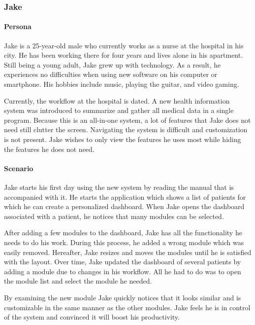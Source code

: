         \subsubsection{Jake}

        \paragraph{Persona} Jake is a 25-year-old male who currently works as a nurse at the hospital in his city. He has been working there for four years and lives alone in his apartment. Still being a young adult, Jake grew up with technology. As a result, he experiences no difficulties when using new software on his computer or smartphone. His hobbies include music, playing the guitar, and video gaming.

        Currently, the workflow at the hospital is dated. A new health information system was introduced to summarize and gather all medical data in a single program. Because this is an all-in-one system, a lot of features that Jake does not need still clutter the screen. Navigating the system is difficult and customization is not present. Jake wishes to only view the features he uses most while hiding the features he does not need.
        
        \paragraph{Scenario} Jake starts his first day using the new system by reading the manual that is accompanied with it. He starts the application which shows a list of patients for which he can create a personalized dashboard. When Jake opens the dashboard associated with a patient, he notices that many modules can be selected.

        After adding a few modules to the dashboard, Jake has all the functionality he needs to do his work. During this process, he added a wrong module which was easily removed. Hereafter, Jake resizes and moves the modules until he is satisfied with the layout. Over time, Jake updated the dashboard of several patients by adding a module due to changes in his workflow. All he had to do was to open the module list and select the module he needed.

        By examining the new module Jake quickly notices that it looks similar and is customizable in the same manner as the other modules. Jake feels he is in control of the system and convinced it will boost his productivity.\bigskip
        
